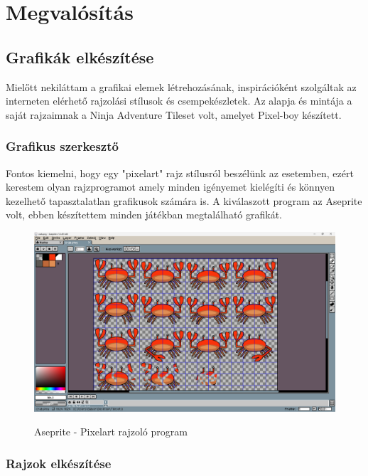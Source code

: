 \chapter{Megvalósítás}

\section{Grafikák elkészítése}

\indent \indent Mielőtt nekiláttam a grafikai elemek létrehozásának, inspirációként szolgáltak az interneten elérhető rajzolási stílusok és csempekészletek. Az alapja és mintája a saját rajzaimnak a Ninja Adventure Tileset volt, amelyet Pixel-boy készített.\cite{NAT}

\subsection{Grafikus szerkesztő}

\indent \indent Fontos kiemelni, hogy egy "pixelart" rajz stílusról beszélünk az esetemben, ezért kerestem olyan rajzprogramot amely minden igényemet kielégíti és könnyen kezelhető tapasztalatlan grafikusok számára is. A kiválaszott program az Aseprite volt, ebben készítettem minden játékban megtalálható grafikát.

\begin{figure}[H]
    \centering
    \includegraphics[width=14.0truecm]{images/Aseprite.png}
    \caption{Aseprite - Pixelart rajzoló program}
    \label{fig:Aseprite}\cite{Aseprite}
\end{figure}


\subsection{Rajzok elkészítése}

